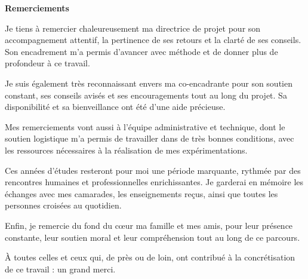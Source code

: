 \vfill{}
\begin{center}
    {
        \Large\bfseries
        Remerciements  %
    }
\end{center}

Je tiens à remercier chaleureusement ma directrice de projet pour son accompagnement attentif, la pertinence de ses retours et la clarté de ses conseils. Son encadrement m’a permis d’avancer avec méthode et de donner plus de profondeur à ce travail.

Je suis également très reconnaissant envers ma co-encadrante pour son soutien constant, ses conseils avisés et ses encouragements tout au long du projet. Sa disponibilité et sa bienveillance ont été d’une aide précieuse.

Mes remerciements vont aussi à l’équipe administrative et technique, dont le soutien logistique m’a permis de travailler dans de très bonnes conditions, avec les ressources nécessaires à la réalisation de mes expérimentations.

Ces années d’études resteront pour moi une période marquante, rythmée par des rencontres humaines et professionnelles enrichissantes. Je garderai en mémoire les échanges avec mes camarades, les enseignements reçus, ainsi que toutes les personnes croisées au quotidien.

Enfin, je remercie du fond du cœur ma famille et mes amis, pour leur présence constante, leur soutien moral et leur compréhension tout au long de ce parcours.

À toutes celles et ceux qui, de près ou de loin, ont contribué à la concrétisation de ce travail : un grand merci.

\vfill{}
\pagebreak